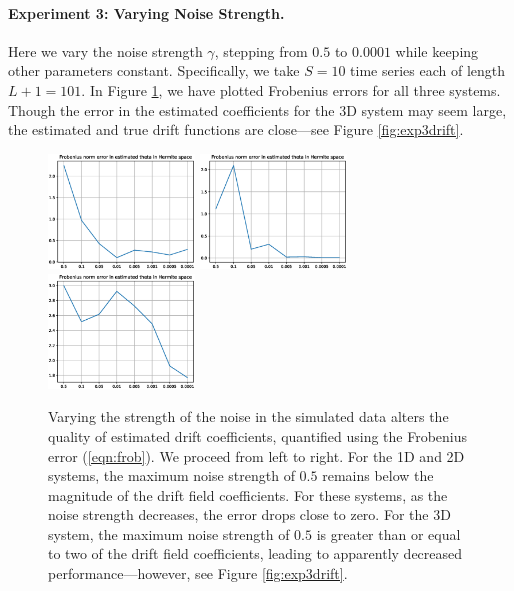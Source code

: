 \documentclass{article}
\begin{document}
\vspace{-1.5ex}
\paragraph{Experiment 3: Varying Noise Strength.} Here we vary the noise strength $\gamma$, stepping from $0.5$ to $0.0001$ while keeping other parameters constant.  Specifically, we take $S=10$ time series each of length $L+1 = 101$.  In Figure \ref{fig:exp3hermite}, we have plotted Frobenius errors for all three systems.  Though the error in the estimated coefficients for the 3D system may seem large, the estimated and true drift functions are close---see Figure \ref{fig:exp3drift}.

\begin{figure}[th]
\begin{center}
\includegraphics[height=1.2in]{../1dcode/varying_noise/plots/hermite.eps}
\includegraphics[height=1.2in]{../2dcode/varying_noise/plots/hermite.eps}
\includegraphics[height=1.2in]{../3ddampedduffing/varying_noise/plots/hermite.eps}
\end{center}
\caption{Varying the strength of the noise in the simulated data alters the quality of estimated drift coefficients, quantified using the Frobenius error (\ref{eqn:frob}).  We proceed from left to right.  For the 1D and 2D systems, the maximum noise strength of $0.5$ remains below the magnitude of the drift field coefficients. For these systems, as the noise strength decreases, the error drops close to zero.  For the 3D system, the maximum noise strength of $0.5$ is greater than or equal to two of the drift field coefficients, leading to apparently decreased performance---however, see Figure \ref{fig:exp3drift}.}
\label{fig:exp3hermite}
\end{figure}
\end{document}
